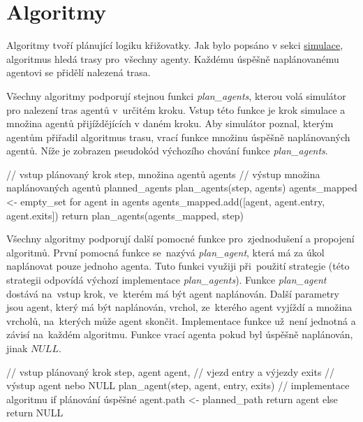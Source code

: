\chapter{Algoritmy}\label{ch:algoritmy}

%

Algoritmy tvoří plánující logiku křižovatky.
Jak bylo popsáno v sekci \hyperref[sec:simulace]{simulace}, algoritmus hledá trasy pro~všechny agenty.
Každému úspěšně naplánovanému agentovi se přidělí nalezená trasa.

Všechny algoritmy podporují stejnou funkci \emph{plan\_agents},
kterou volá simulátor pro nalezení tras agentů v~určitém kroku.
Vstup této funkce je krok simulace a množina agentů přijíždějících v daném kroku.
Aby simulátor poznal, kterým agentům přiřadil algoritmus trasu, vrací funkce množinu úspěšně naplánovaných agentů.
Níže je zobrazen pseudokód výchozího chování funkce \emph{plan\_agents}.

\begin{code}[xrightmargin=6em]
	// vstup plánovaný krok step, množina agentů agents
	// výstup množina naplánovaných agentů planned_agents
	plan_agents(step, agents)
	agents_mapped <- empty_set
	for agent in agents
	agents_mapped.add([agent, agent.entry, agent.exits])
	return plan_agents(agents_mapped, step)
\end{code}

Všechny algoritmy podporují další pomocné funkce pro~zjednodušení a propojení algoritmů.
První pomocná funkce se~nazývá \emph{plan\_agent},
která má za úkol naplánovat pouze jednoho agenta.
Tuto funkci využiji při~použití  strategie
(této strategii odpovídá výchozí implementace \emph{plan\_agents}).
Funkce \emph{plan\_agent} dostává na~vstup krok, ve~kterém má být agent naplánován.
Další parametry jsou agent, který má být naplánován, vrchol,
ze~kterého agent vyjíždí a množina vrcholů, na~kterých může agent skončit.
Implementace funkce už~není jednotná a závisí na~každém algoritmu.
Funkce vrací agenta pokud byl úspěšně naplánován, jinak $NULL$.

\begin{code}[xrightmargin=14em]
	// vstup plánovaný krok step, agent agent,
	// vjezd entry a výjezdy exits
	// výstup agent nebo NULL
	plan_agent(step, agent, entry, exits)
	// implementace algoritmu
	if plánování úspěšné
	agent.path <- planned_path
	return agent
	else
	return NULL
\end{code}

